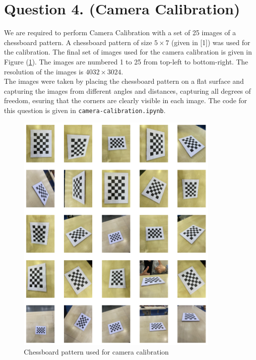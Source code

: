 \documentclass[10pt]{article}
\newcommand{\figref}[1]{Figure (\ref{fig:#1})}
\begin{document}
    \section*{\textbf{Question 4. (Camera Calibration)}}
    We are required to perform Camera Calibration with a set of 25 images of
    a chessboard pattern. A chessboard pattern of size $5 \times 7$ (given in
    [1]) was used for the calibration. The final set of images used for the
    camera calibration is given in \figref{final-image-set}. The images
    are numbered 1 to 25 from top-left to bottom-right. The resolution of the
    images is $4032 \times 3024$. \\
    The images were taken by placing the chessboard pattern on a flat surface
    and capturing the images from different angles and distances, capturing all
    degrees of freedom, esuring that the corners are clearly visible in each image.
    The code for this question is given in \texttt{camera-calibration.ipynb}.
    \begin{figure}[htbp]
        \begin{center}
            \includegraphics[width=0.875\textwidth]{Assets/Question-4/final-image-set.png}
            \caption{Chessboard pattern used for camera calibration}
            \label{fig:final-image-set}
        \end{center}
    \end{figure}
\end{document}
